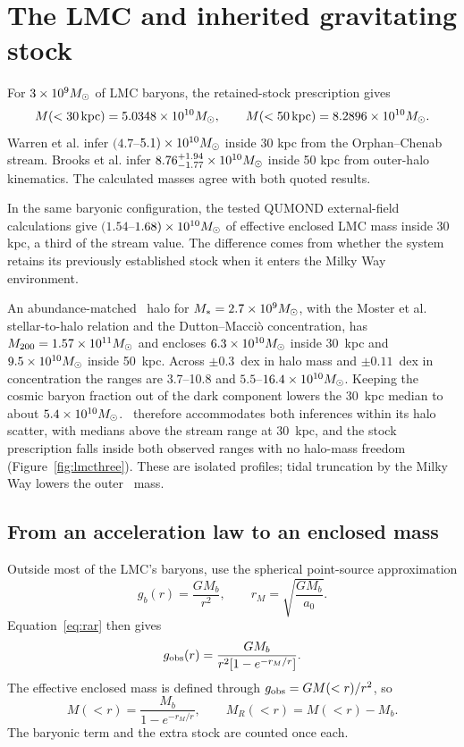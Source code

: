 \section{The LMC and inherited gravitating stock}
\label{sec:lmc}

For $3\times10^9M_\odot$ of LMC baryons, the retained-stock prescription gives
\begin{equation}
M(<30\,\mathrm{kpc})=5.0348\times10^{10}M_\odot,
\qquad
M(<50\,\mathrm{kpc})=8.2896\times10^{10}M_\odot.
\label{eq:lmcmasses}
\end{equation}
Warren et al. infer $(4.7$--$5.1)\times10^{10}M_\odot$ inside 30 kpc from
the Orphan--Chenab stream. Brooks et al. infer
$8.76^{+1.94}_{-1.77}\times10^{10}M_\odot$ inside 50 kpc from outer-halo
kinematics. The calculated masses agree with both quoted results.
\cite{warren,brooks}

In the same baryonic configuration, the tested QUMOND external-field
calculations give $(1.54$--$1.68)\times10^{10}M_\odot$ of effective
enclosed LMC mass inside 30 kpc, a third of the stream value. The
difference comes from whether the system retains its previously
established stock when it enters the Milky Way environment.

An abundance-matched \LCDM\ halo for $M_*=2.7\times10^9M_\odot$, with the
Moster et al. stellar-to-halo relation and the Dutton--Macci\`o
concentration, has $M_{200}=1.57\times10^{11}M_\odot$ and encloses
$6.3\times10^{10}M_\odot$ inside 30~kpc and $9.5\times10^{10}M_\odot$ inside
50~kpc. Across $\pm0.3$~dex in halo mass and $\pm0.11$~dex in
concentration the ranges are 3.7--10.8 and $5.5$--$16.4\times10^{10}M_\odot$.
Keeping the cosmic baryon fraction out of the dark component lowers the
30~kpc median to about $5.4\times10^{10}M_\odot$. \LCDM\ therefore
accommodates both inferences within its halo scatter, with medians above
the stream range at 30~kpc, and the stock prescription falls inside both
observed ranges with no halo-mass freedom
(Figure~\ref{fig:lmcthree}). These are isolated profiles; tidal
truncation by the Milky Way lowers the outer \LCDM\ mass.
\cite{moster,dutton}

\subsection{From an acceleration law to an enclosed mass}

Outside most of the LMC's baryons, use the spherical point-source
approximation
\begin{equation}
g_b(r)=\frac{GM_b}{r^2},\qquad
r_M=\sqrt{\frac{GM_b}{a_0}}.
\end{equation}
Equation~\eqref{eq:rar} then gives
\begin{equation}
g_{\rm obs}(r)=\frac{GM_b}{r^2[1-e^{-r_M/r}]}.
\end{equation}
The effective enclosed mass is defined through $g_{\rm obs}=GM(<r)/r^2$,
so
\begin{equation}
M(<r)=\frac{M_b}{1-e^{-r_M/r}},\qquad
M_R(<r)=M(<r)-M_b.
\label{eq:lmcprofile}
\end{equation}
The baryonic term and the extra stock are counted once each.

